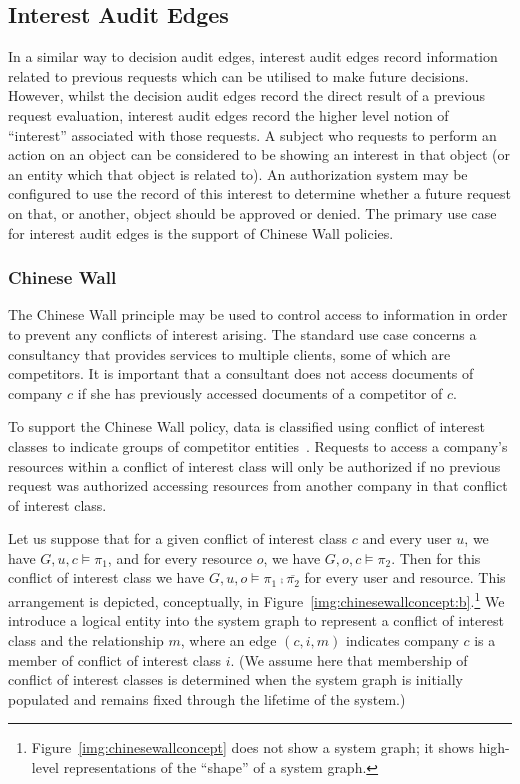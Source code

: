\documentclass{article}
\begin{document}
\subsection{Interest Audit Edges}\label{sec:extended_typed_edges:interest_audit_edges}
In a similar way to decision audit edges, interest audit edges record information related to previous requests which can be utilised to make future decisions.
However, whilst the decision audit edges record the direct result of a previous request evaluation, interest audit edges record the higher level notion of ``interest'' associated with those requests.
A subject who requests to perform an action on an object can be considered to be showing an interest in that object (or an entity which that object is related to).
An authorization system may be configured to use the record of this interest to determine whether a future request on that, or another, object should be approved or denied.
The primary use case for interest audit edges is the support of Chinese Wall policies.

\subsubsection{Chinese Wall}\label{sec:extended_typed_edges:interest_audit_edges:chinese_wall}
The Chinese Wall principle may be used to control access to information in order to prevent any conflicts of interest arising.
The standard use case concerns a consultancy that provides services to multiple clients, some of which are competitors.
It is important that a consultant does not access documents of company $c$ if she has previously accessed documents of a competitor of $c$.

To support the Chinese Wall policy, data is classified using conflict of interest classes to indicate groups of competitor entities~\cite{BrewerN89}.
Requests to access a company's resources within a conflict of interest class will only be authorized if no previous request was authorized accessing resources from another company in that conflict of interest class.

Let us suppose that for a given conflict of interest class $c$ and every user $u$, we have $G,u,c \models \pi_1$, and for every resource $o$, we have $G,o,c \models \pi_2$.
Then for this conflict of interest class we have $G,u,o \models \pi_1 \comp \overline{\pi_2}$ for every user and resource.
This arrangement is depicted, conceptually, in Figure~\ref{img:chinesewallconcept:b}.\footnote{Figure~\ref{img:chinesewallconcept} does not show a system graph; it shows high-level representations of the ``shape'' of a system graph.}
We introduce a logical entity into the system graph to represent a conflict of interest class and the relationship $m$, where an edge $(c,i,m)$ indicates company $c$ is a member of conflict of interest class $i$.
(We assume here that membership of conflict of interest classes is determined when the system graph is initially populated and remains fixed through the lifetime of the system.)
\end{document}
